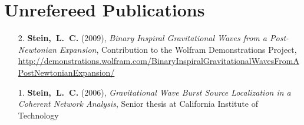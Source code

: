 \section{\sc Unrefereed Publications}
\begin{enumerate}
\item[{2.}] {\bf Stein,~L.~C.} (2009), {\it Binary Inspiral
    Gravitational Waves from a Post-Newtonian Expansion}, Contribution
  to the Wolfram Demonstrations Project, \url{http://demonstrations.wolfram.com/BinaryInspiralGravitationalWavesFromAPostNewtonianExpansion/}
\item[{1.}] {\bf Stein,~L.~C.} (2006), {\it Gravitational Wave Burst Source Localization in a Coherent Network Analysis}, Senior thesis at California Institute of Technology
\end{enumerate}
